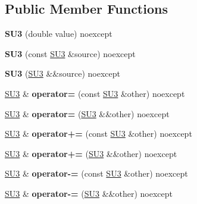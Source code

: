 \subsection*{Public Member Functions}
\begin{DoxyCompactItemize}
\item 
{\bfseries S\+U3} (double value) noexcept\hypertarget{structSU3_a15946478b359476373404300768a0cfc}{}\label{structSU3_a15946478b359476373404300768a0cfc}

\item 
{\bfseries S\+U3} (const \hyperlink{structSU3}{S\+U3} \&source) noexcept\hypertarget{structSU3_a622bffa0da5f1b3970d693fcd223cc3c}{}\label{structSU3_a622bffa0da5f1b3970d693fcd223cc3c}

\item 
{\bfseries S\+U3} (\hyperlink{structSU3}{S\+U3} \&\&source) noexcept\hypertarget{structSU3_aa8803a4e0fe94741b8b19a11e7fd4f59}{}\label{structSU3_aa8803a4e0fe94741b8b19a11e7fd4f59}

\item 
\hyperlink{structSU3}{S\+U3} \& {\bfseries operator=} (const \hyperlink{structSU3}{S\+U3} \&other) noexcept\hypertarget{structSU3_a8cba1351e42d60515e99391878012e08}{}\label{structSU3_a8cba1351e42d60515e99391878012e08}

\item 
\hyperlink{structSU3}{S\+U3} \& {\bfseries operator=} (\hyperlink{structSU3}{S\+U3} \&\&other) noexcept\hypertarget{structSU3_ae691a930d90c9247dfdd1538826b0e86}{}\label{structSU3_ae691a930d90c9247dfdd1538826b0e86}

\item 
\hyperlink{structSU3}{S\+U3} \& {\bfseries operator+=} (const \hyperlink{structSU3}{S\+U3} \&other) noexcept\hypertarget{structSU3_a4534185b8910bddd672dd2686613e5cd}{}\label{structSU3_a4534185b8910bddd672dd2686613e5cd}

\item 
\hyperlink{structSU3}{S\+U3} \& {\bfseries operator+=} (\hyperlink{structSU3}{S\+U3} \&\&other) noexcept\hypertarget{structSU3_ae9ecdb599a8afee35a4044c17424a15a}{}\label{structSU3_ae9ecdb599a8afee35a4044c17424a15a}

\item 
\hyperlink{structSU3}{S\+U3} \& {\bfseries operator-\/=} (const \hyperlink{structSU3}{S\+U3} \&other) noexcept\hypertarget{structSU3_a1e95abef99c6d8e02ab9e1b939c98b7d}{}\label{structSU3_a1e95abef99c6d8e02ab9e1b939c98b7d}

\item 
\hyperlink{structSU3}{S\+U3} \& {\bfseries operator-\/=} (\hyperlink{structSU3}{S\+U3} \&\&other) noexcept\hypertarget{structSU3_af6e733c2d12e42c56d8f441af82f2175}{}\label{structSU3_af6e733c2d12e42c56d8f441af82f2175}


\end{DoxyCompactItemize}
